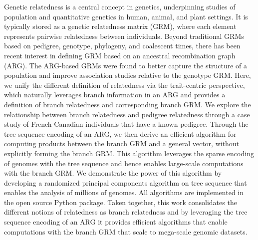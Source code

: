 Genetic relatedness is a central concept in genetics,
underpinning studies of population and quantitative genetics in human, animal, and plant settings.
%
It is typically stored as a genetic relatedness matrix (GRM),
where each element represents pairwise relatedness between individuals.
%
Beyond traditional GRMs based on pedigree, genotype, phylogeny, and coalescent times,
there has been recent interest in defining GRM based on an ancestral recombination graph (ARG).
%
The ARG-based GRMs were found to better capture the structure of a population and
improve association studies relative to the genotype GRM.
%
Here, we unify the different definition of relatedness via the trait-centric perspective, which naturally leverages branch information in an ARG and provides a definition of branch relatedness and corresponding branch GRM.
%
We explore the relationship between branch relatedness and pedigree relatedness through a case study of French-Canadian individuals that have a known pedigree.
%
Through the tree sequence encoding of an ARG, we then derive an efficient algorithm for computing products between the branch GRM and a general vector, without explicitly forming the branch GRM.
%
This algorithm leverages the sparse encoding of genomes with the tree sequence and hence enables large-scale computations with the branch GRM.
%
We demonstrate the power of this algorithm by developing
a randomized principal components algorithm on tree sequence
that enables the analysis of millions of genomes.
%
All algorithms are implemented in the open source \tskit{} Python package.
%
Taken together, this work consolidates the different notions of relatedness as branch relatedness
and by leveraging the tree sequence encoding of an ARG it provides efficient algorithms
that enable computations with the branch GRM that scale to mega-scale genomic datasets.
